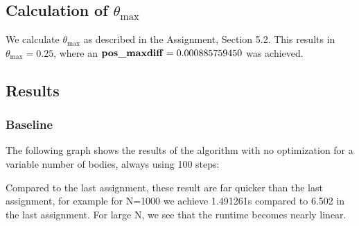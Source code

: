 \documentclass[a4paper]{scrartcl}
\begin{document}
    \subsection{Calculation of $\theta_{\max}$}
        
        We calculate $\theta_{\max}$ as described in the Assignment, Section
        5.2. This results in $\theta_{\max} = 0.25$, where an
        $\text{\textbf{pos\_maxdiff}} = 0.000885759450$ was achieved.
    \subsection{Results}
        \subsubsection{Baseline}\label{sec:Baseline}
            The following graph shows the results of the algorithm with no
            optimization for a variable number of bodies, always using 100 steps:

            

            Compared to the last assignment, these result are far quicker than
            the last assignment, for example for N=1000 we achieve 1.491261s
            compared to 6.502 in the last assignment. For large N, we see that
            the runtime becomes nearly linear.
\end{document}
